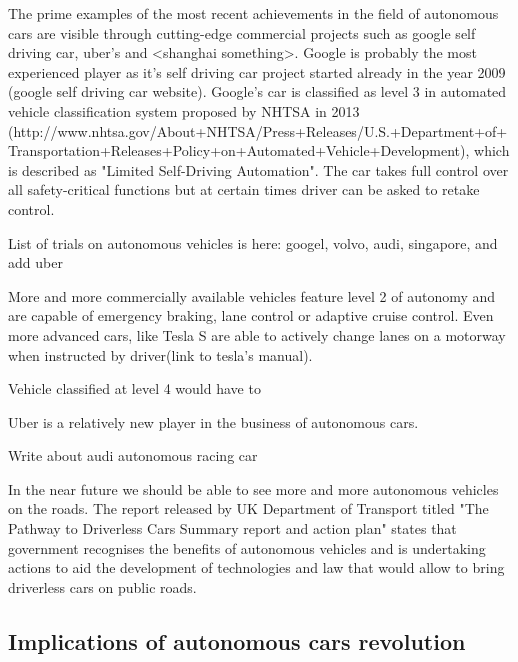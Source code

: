 \documentclass[11pt]{article}
\begin{document}
The prime examples of the most recent achievements in the field of autonomous cars are visible through cutting-edge commercial projects such as google self driving car, uber's and <shanghai something>. Google is probably the most experienced player as it's self driving car project started already in the year 2009 (google self driving car website).
Google's car is classified as level 3 in automated vehicle classification system proposed by NHTSA in 2013 (http://www.nhtsa.gov/About+NHTSA/Press+Releases/U.S.+Department+of+Transportation+Releases+Policy+on+Automated+Vehicle+Development), which is described as "Limited Self-Driving Automation". The car takes full control over all safety-critical functions but at certain times driver can be asked to retake control. 

List of trials on autonomous vehicles is here:
\citep{parkin2016understanding}
googel, volvo, audi, singapore, and add uber


More and more commercially available vehicles feature level 2 of autonomy and are capable of emergency braking, lane control or adaptive cruise control. Even more advanced cars, like Tesla S are able to actively change lanes on a motorway when instructed by driver(link to tesla's manual).


Vehicle classified at level 4 would have to 


Uber is a relatively new player in the business of autonomous cars. 



Write about audi autonomous racing car


In the near future we should be able to see more and more autonomous vehicles on the roads.
The report released by UK Department of Transport titled "The Pathway to Driverless Cars Summary report and action plan" \citep{pathwaytodriverless} states that government recognises the benefits of autonomous vehicles and is undertaking actions to aid the development of technologies and law that would allow to bring driverless cars on public roads. 


\subsection{Implications of autonomous cars revolution}
\end{document}
